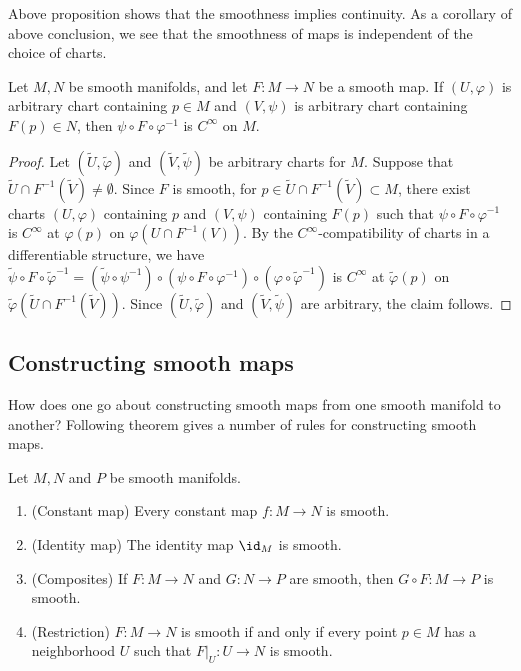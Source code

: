 Above proposition shows that the smoothness implies continuity. As a corollary of above conclusion, we see that the smoothness of maps is independent of the choice of charts.

\begin{corollary}\label{lem:smoothness is independent of chars}
    Let $M, N$ be smooth manifolds, and let $F : M \to N$ be a smooth map. If $(U, \varphi)$ is arbitrary chart containing $p \in M$ and $(V, \psi)$ is arbitrary chart containing $F(p) \in N$, then $\psi\circ F \circ \varphi^{-1}$ is $C^\infty$ on $M$.
\end{corollary}

\begin{proof}
    Let $(\widetilde{U}, \widetilde{\varphi})$ and $(\widetilde{V}, \widetilde{\psi})$ be arbitrary charts for $M$. Suppose that $\widetilde{U} \cap F^{-1}(\widetilde{V}) \neq \emptyset$. Since $F$ is smooth, for $p \in \widetilde{U} \cap F^{-1}(\widetilde{V}) \subset M$, there exist charts $(U, \varphi)$ containing $p$ and $(V, \psi)$ containing $F(p)$ such that $\psi \circ F \circ \varphi^{-1}$ is $C^\infty$ at $\varphi(p)$ on $\varphi(U \cap F^{-1}(V))$. By the $C^\infty$-compatibility of charts in a differentiable structure, we have $\widetilde{\psi} \circ F \circ \widetilde{\varphi}^{-1} = (\widetilde{\psi} \circ \psi^{-1}) \circ (\psi \circ F \circ \varphi^{-1}) \circ (\varphi \circ \widetilde{\varphi}^{-1})$ is $C^\infty$ at $\widetilde{\varphi}(p)$ on $\widetilde{\varphi}(\widetilde{U} \cap F^{-1}(\widetilde{V}))$. Since $(\widetilde{U}, \widetilde{\varphi})$ and $(\widetilde{V}, \widetilde{\psi})$ are arbitrary, the claim follows.
\end{proof}

\subsection{Constructing smooth maps}

How does one go about constructing smooth maps from one smooth manifold to another? Following theorem gives a number of rules for constructing smooth maps.

\begin{theorem}\label{lem:construction of smooth maps}
    Let $M, N$ and $P$ be smooth manifolds.
    \begin{enumerate}
        \item (Constant map) Every constant map $f : M \to N$ is smooth.
        \item (Identity map) The identity map $\id_M$ is smooth.
        \item (Composites) If $F : M \to N$ and $G : N \to P$ are smooth, then $G \circ F : M \to P$ is smooth.
        \item (Restriction) $F : M \to N$ is smooth if and only if every point $p \in M$ has a neighborhood $U$ such that $F|_U : U \to N$ is smooth.
    \end{enumerate}
\end{theorem}

